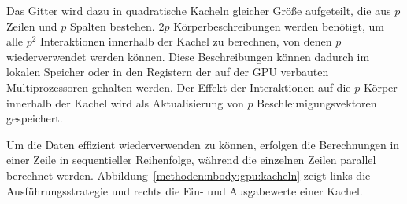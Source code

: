 Das Gitter wird dazu in quadratische Kacheln gleicher Größe aufgeteilt, die aus
$p$ Zeilen und $p$ Spalten bestehen. $2p$ Körperbeschreibungen werden benötigt,
um alle $p^2$ Interaktionen innerhalb der Kachel zu berechnen, von denen $p$
wiederverwendet werden können. Diese Beschreibungen können dadurch im lokalen
Speicher oder in den Registern der auf der GPU verbauten Multiprozessoren
gehalten werden. Der Effekt der Interaktionen auf die $p$ Körper innerhalb der
Kachel wird als Aktualisierung von $p$ Beschleunigungsvektoren gespeichert.

Um die Daten effizient wiederverwenden zu können, erfolgen die Berechnungen
in einer Zeile in sequentieller Reihenfolge, während die einzelnen Zeilen
parallel berechnet werden. Abbildung~\ref{methoden:nbody:gpu:kacheln} zeigt
links die Ausführungsstrategie und rechts die Ein- und Ausgabewerte einer
Kachel.

